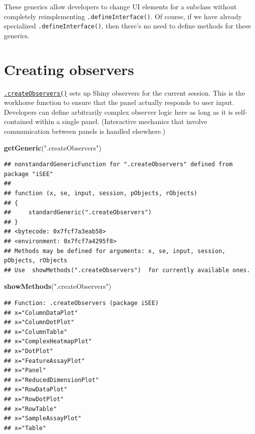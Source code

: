 \documentclass[
]{book}
\newenvironment{Shaded}{\begin{snugshade}}{\end{snugshade}}
\newcommand{\KeywordTok}[1]{\textcolor[rgb]{0.13,0.29,0.53}{\textbf{#1}}}
\newcommand{\NormalTok}[1]{#1}
\newcommand{\StringTok}[1]{\textcolor[rgb]{0.31,0.60,0.02}{#1}}
\begin{document}
These generics allow developers to change UI elements for a subclass without completely reimplementing \texttt{.defineInterface()}.
Of course, if we have already specialized \texttt{.defineInterface()}, then there's no need to define methods for these generics.

\hypertarget{creating-observers}{%
\section{Creating observers}\label{creating-observers}}

\href{https://isee.github.io/iSEE/reference/observer-generics.html}{\texttt{.createObservers()}} sets up Shiny observers for the current session.
This is the workhorse function to ensure that the panel actually responds to user input.
Developers can define arbitrarily complex observer logic here as long as it is self-contained within a single panel.
(Interactive mechanics that involve communication between panels is handled elsewhere.)

\begin{Shaded}
\begin{Highlighting}[]
\KeywordTok{getGeneric}\NormalTok{(}\StringTok{".createObservers"}\NormalTok{)}
\end{Highlighting}
\end{Shaded}

\begin{verbatim}
## nonstandardGenericFunction for ".createObservers" defined from package "iSEE"
## 
## function (x, se, input, session, pObjects, rObjects) 
## {
##     standardGeneric(".createObservers")
## }
## <bytecode: 0x7fcf7a3eab58>
## <environment: 0x7fcf7a4295f8>
## Methods may be defined for arguments: x, se, input, session, pObjects, rObjects
## Use  showMethods(".createObservers")  for currently available ones.
\end{verbatim}

\begin{Shaded}
\begin{Highlighting}[]
\KeywordTok{showMethods}\NormalTok{(}\StringTok{".createObservers"}\NormalTok{)}
\end{Highlighting}
\end{Shaded}

\begin{verbatim}
## Function: .createObservers (package iSEE)
## x="ColumnDataPlot"
## x="ColumnDotPlot"
## x="ColumnTable"
## x="ComplexHeatmapPlot"
## x="DotPlot"
## x="FeatureAssayPlot"
## x="Panel"
## x="ReducedDimensionPlot"
## x="RowDataPlot"
## x="RowDotPlot"
## x="RowTable"
## x="SampleAssayPlot"
## x="Table"
\end{verbatim}
\end{document}
